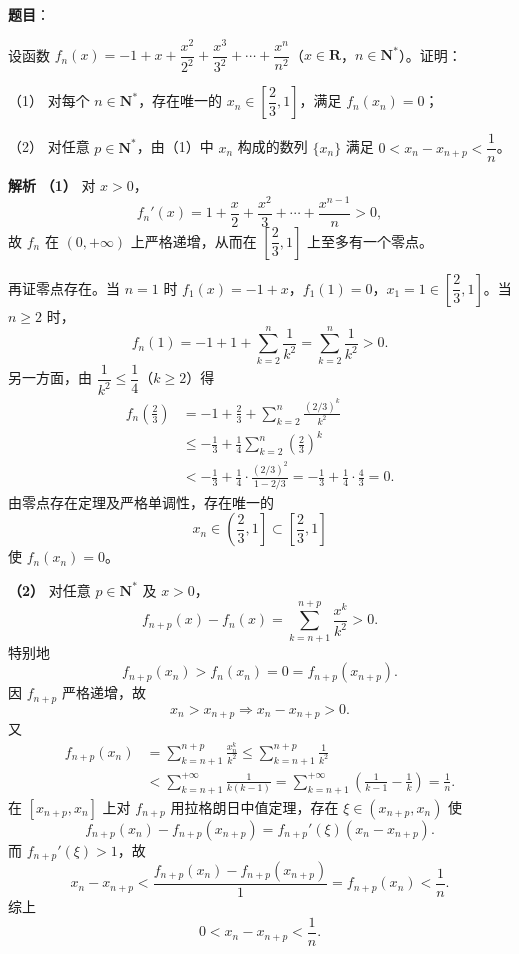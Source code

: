 \begin{answer}

\textbf{题目}：

设函数 $f_n(x)=-1+x+\dfrac{x^2}{2^2}+\dfrac{x^3}{3^2}+\cdots+\dfrac{x^n}{n^2}$（$x\in\mathbf R$，$n\in\mathbf N^*$）。证明：

（1） 对每个 $n\in\mathbf N^*$，存在唯一的 $x_n\in\left[\dfrac23,1\right]$，满足 $f_n(x_n)=0$；

（2） 对任意 $p\in\mathbf N^*$，由（1）中 $x_n$ 构成的数列 $\{x_n\}$ 满足 $0<x_n-x_{n+p}<\dfrac1n$。

\textbf{解析}
\textbf{（1）} 对 $x>0$，
\nopagebreak[4]
\[f_n'(x)=1+\frac{x}{2}+\frac{x^2}{3}+\cdots+\frac{x^{n-1}}{n}>0,\]
故 $f_n$ 在 $(0,+\infty)$ 上严格递增，从而在 $\left[\dfrac23,1\right]$ 上至多有一个零点。

再证零点存在。当 $n=1$ 时 $f_1(x)=-1+x$，$f_1(1)=0$，$x_1=1\in\left[\dfrac23,1\right]$。当 $n\geqslant2$ 时，
\nopagebreak[4]
\[f_n(1)=-1+1+\sum_{k=2}^n\frac1{k^2}=\sum_{k=2}^n\frac1{k^2}>0.\]
另一方面，由 $\dfrac1{k^2}\leqslant\dfrac14$（$k\geqslant2$）得
\nopagebreak[4]
\[\begin{aligned}
f_n\left(\frac23\right)
&=-1+\frac23+\sum_{k=2}^n\frac{(2/3)^k}{k^2}\\
&\leqslant-\frac13+\frac14\sum_{k=2}^n\left(\frac23\right)^k\\
&<-\frac13+\frac14\cdot\frac{(2/3)^2}{1-2/3}
=-\frac13+\frac14\cdot\frac43=0.
\end{aligned}\]
由零点存在定理及严格单调性，存在唯一的
\nopagebreak[4]
\[x_n\in\left(\frac23,1\right]\subset\left[\frac23,1\right]\]
使 $f_n(x_n)=0$。

\textbf{（2）} 对任意 $p\in\mathbf N^*$ 及 $x>0$，
\nopagebreak[4]
\[f_{n+p}(x)-f_n(x)=\sum_{k=n+1}^{n+p}\frac{x^k}{k^2}>0.\]
特别地
\nopagebreak[4]
\[f_{n+p}(x_n)>f_n(x_n)=0=f_{n+p}(x_{n+p}).\]
因 $f_{n+p}$ 严格递增，故
\nopagebreak[4]
\[x_n>x_{n+p}\Longrightarrow x_n-x_{n+p}>0.\]
又
\nopagebreak[4]
\[\begin{aligned}
f_{n+p}(x_n)
&=\sum_{k=n+1}^{n+p}\frac{x_n^k}{k^2}
\leqslant\sum_{k=n+1}^{n+p}\frac1{k^2}\\
&<\sum_{k=n+1}^{+\infty}\frac1{k(k-1)}
=\sum_{k=n+1}^{+\infty}\left(\frac1{k-1}-\frac1k\right)=\frac1n.
\end{aligned}\]
在 $[x_{n+p},x_n]$ 上对 $f_{n+p}$ 用拉格朗日中值定理，存在 $\xi\in(x_{n+p},x_n)$ 使
\nopagebreak[4]
\[f_{n+p}(x_n)-f_{n+p}(x_{n+p})=f_{n+p}'(\xi)(x_n-x_{n+p}).\]
而 $f_{n+p}'(\xi)>1$，故
\nopagebreak[4]
\[x_n-x_{n+p}<\frac{f_{n+p}(x_n)-f_{n+p}(x_{n+p})}{1}=f_{n+p}(x_n)<\frac1n.\]
综上
\nopagebreak[4]
\[0<x_n-x_{n+p}<\frac1n.\]



\end{answer}
